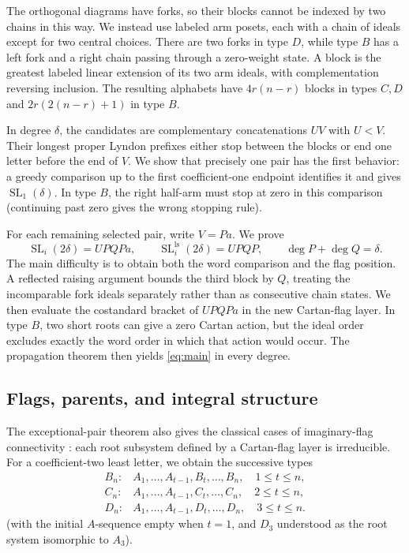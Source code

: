 \documentclass[11pt]{amsart}
\numberwithin{equation}{section}
\theoremstyle{definition}
\DeclareMathOperator{\SL}{SL}
\newcommand{\ls}{\mathrm{ls}}
\begin{document}
The orthogonal diagrams have forks, so their blocks cannot be indexed by two chains in this way. We instead use labeled arm posets, each with a chain of ideals except for two central choices. There are two forks in type $D$, while type $B$ has a left fork and a right chain passing through a zero-weight state. A block is the greatest labeled linear extension of its two arm ideals, with complementation reversing inclusion. The resulting alphabets have $4r(n-r)$ blocks in types $C,D$ and $2r(2(n-r)+1)$ in type $B$.

In degree $\delta$, the candidates are complementary concatenations $UV$ with $U<V$. Their longest proper Lyndon prefixes either stop between the blocks or end one letter before the end of $V$. We show that precisely one pair has the first behavior: a greedy comparison up to the first coefficient-one endpoint identifies it and gives $\SL_1(\delta)$. In type $B$, the right half-arm must stop at zero in this comparison (continuing past zero gives the wrong stopping rule).

For each remaining selected pair, write $V=Pa$. We prove
\[
 \SL_i(2\delta)=UPQPa,
 \qquad
 \SL_i^{\ls}(2\delta)=UPQP,
 \qquad \deg P+\deg Q=\delta.
\]
The main difficulty is to obtain both the word comparison and the flag position. A reflected raising argument bounds the third block by $Q$, treating the incomparable fork ideals separately rather than as consecutive chain states. We then evaluate the costandard bracket of $UPQPa$ in the new Cartan-flag layer. In type $B$, two short roots can give a zero Cartan action, but the ideal order excludes exactly the word order in which that action would occur. The propagation theorem \cite[Proposition~6.32]{ET} then yields \eqref{eq:main} in every degree.

\subsection{Flags, parents, and integral structure}
The exceptional-pair theorem also gives the classical cases of imaginary-flag connectivity \cite[Conjecture~4.27]{ETC}: each root subsystem defined by a Cartan-flag layer is irreducible. For a coefficient-two least letter, we obtain the successive types
\[
 \begin{array}{ll}
 B_n:& A_1,\ldots,A_{t-1},B_t,\ldots,B_n,\quad 1\leq t\leq n,\\
 C_n:& A_1,\ldots,A_{t-1},C_t,\ldots,C_n,\quad 2\leq t\leq n,\\
 D_n:& A_1,\ldots,A_{t-1},D_t,\ldots,D_n,\quad 3\leq t\leq n.
 \end{array}
\]
(with the initial $A$-sequence empty when $t=1$, and $D_3$ understood as the root system isomorphic to $A_3$).
\end{document}
